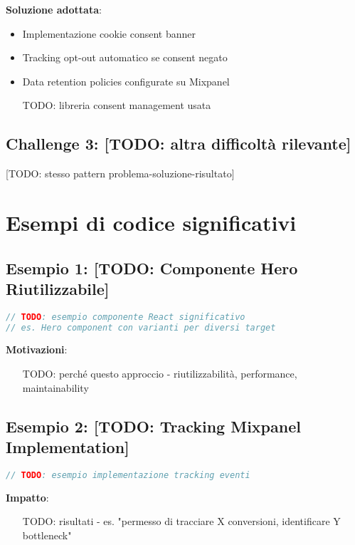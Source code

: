 \textbf{Soluzione adottata}:
\begin{itemize}
  \item Implementazione cookie consent banner
  \item Tracking opt-out automatico se consent negato
  \item Data retention policies configurate su Mixpanel
  \item [TODO: libreria consent management usata]
\end{itemize}

\subsection{Challenge 3: [TODO: altra difficoltà rilevante]}
[TODO: stesso pattern problema-soluzione-risultato]

\section{Esempi di codice significativi}

\subsection{Esempio 1: [TODO: Componente Hero Riutilizzabile]}
\begin{lstlisting}[language=JavaScript]
// TODO: esempio componente React significativo
// es. Hero component con varianti per diversi target
\end{lstlisting}

\textbf{Motivazioni}:
\begin{itemize}
  \item [TODO: perché questo approccio - riutilizzabilità, performance, maintainability]
\end{itemize}

\subsection{Esempio 2: [TODO: Tracking Mixpanel Implementation]}
\begin{lstlisting}[language=JavaScript]
// TODO: esempio implementazione tracking eventi
\end{lstlisting}

\textbf{Impatto}:
\begin{itemize}
  \item [TODO: risultati - es. "permesso di tracciare X conversioni, identificare Y bottleneck"]
\end{itemize}

